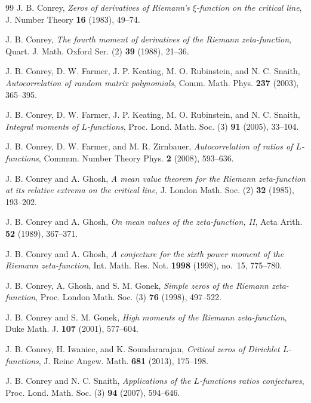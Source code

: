 \begin{thebibliography}{99}
J. B. Conrey,
\emph{Zeros of derivatives of Riemann's $\xi$-function on the critical line},
J. Number Theory \textbf{16} (1983), 49--74.

J. B. Conrey,
\emph{The fourth moment of derivatives of the Riemann zeta-function},
Quart. J. Math. Oxford Ser. (2) \textbf{39} (1988), 21--36.

J. B. Conrey, D. W. Farmer, J. P. Keating, M. O. Rubinstein, and N. C. Snaith,
\emph{Autocorrelation of random matrix polynomials},
Comm. Math. Phys. \textbf{237} (2003), 365--395.

J. B. Conrey, D. W. Farmer, J. P. Keating, M. O. Rubinstein, and N. C. Snaith,
\emph{Integral moments of $L$-functions},
Proc. Lond. Math. Soc. (3) \textbf{91} (2005), 33--104.

J. B. Conrey, D. W. Farmer, and M. R. Zirnbauer,
\emph{Autocorrelation of ratios of $L$-functions},
Commun. Number Theory Phys. \textbf{2} (2008), 593--636.

J. B. Conrey and A. Ghosh,
\emph{A mean value theorem for the Riemann zeta-function at its relative extrema on the critical line},
J. London Math. Soc. (2) \textbf{32} (1985), 193--202.

J. B. Conrey and A. Ghosh,
\emph{On mean values of the zeta-function, II},
Acta Arith. \textbf{52} (1989), 367--371.

J. B. Conrey and A. Ghosh,
\emph{A conjecture for the sixth power moment of the Riemann zeta-function},
Int. Math. Res. Not. \textbf{1998} (1998), no.~15, 775--780.

J. B. Conrey, A. Ghosh, and S. M. Gonek,
\emph{Simple zeros of the Riemann zeta-function},
Proc. London Math. Soc. (3) \textbf{76} (1998), 497--522.

J. B. Conrey and S. M. Gonek,
\emph{High moments of the Riemann zeta-function},
Duke Math. J. \textbf{107} (2001), 577--604.

J. B. Conrey, H. Iwaniec, and K. Soundararajan,
\emph{Critical zeros of Dirichlet $L$-functions},
J. Reine Angew. Math. \textbf{681} (2013), 175--198.

J. B. Conrey and N. C. Snaith,
\emph{Applications of the $L$-functions ratios conjectures},
Proc. Lond. Math. Soc. (3) \textbf{94} (2007), 594--646.


\end{thebibliography}
